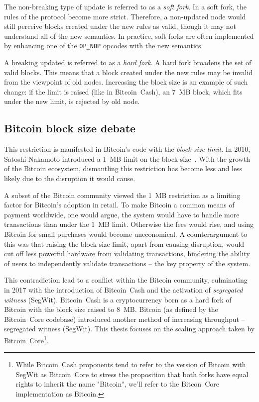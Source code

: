 The non-breaking type of update is referred to as a \textit{soft fork}.
In a soft fork, the rules of the protocol become more strict.
Therefore, a non-updated node would still perceive blocks created under the new rules as valid, though it may not understand all of the new semantics.
In practice, soft forks are often implemented by enhancing one of the \texttt{OP_NOP} opcodes with the new semantics.

A breaking updated is referred to as a \textit{hard fork}.
A hard fork broadens the set of valid blocks.
This means that a block created under the new rules may be invalid from the viewpoint of old nodes.
Increasing the block size is an example of such change: if the limit is raised (like in Bitcoin~Cash), an 7~MB block, which fits under the new limit, is rejected by old node.

\subsection{Bitcoin block size debate}

This restriction is manifested in Bitcoin's code with the \textit{block size limit}.
In 2010, Satoshi Nakamoto introduced a 1~MB limit on the block size~\cite{Nakamoto2010}.
With the growth of the Bitcoin ecosystem, dismantling this restriction has become less and less likely due to the disruption it would cause.

A subset of the Bitcoin community viewed the 1~MB restriction as a limiting factor for Bitcoin's adoption in retail.
To make Bitcoin a common means of payment worldwide, one would argue, the system would have to handle more transactions than under the 1~MB limit.
Otherwise the fees would rise, and using Bitcoin for small purchases would become uneconomical.
A counterargument to this was that raising the block size limit, apart from causing disruption, would cut off less powerful hardware from validating transactions, hindering the ability of users to independently validate transactions -- the key property of the system.

This contradiction lead to a conflict within the Bitcoin community, culminating in 2017 with the introduction of Bitcoin~Cash and the activation of \textit{segregated witness} (SegWit).
Bitcoin~Cash is a cryptocurrency born as a hard fork of Bitcoin with the block size raised to 8~MB.
Bitcoin (as defined by the Bitcoin~Core codebase) introduced another method of increasing throughput -- segregated witness (SegWit).
This thesis focuses on the scaling approach taken by Bitcoin~Core\footnote{While Bitcoin~Cash proponents tend to refer to the version of Bitcoin with SegWit as Bitcoin~Core to stress the proposition that both forks have equal rights to inherit the name "Bitcoin", we'll refer to the Bitcon~Core implementation as Bitcoin.}.

